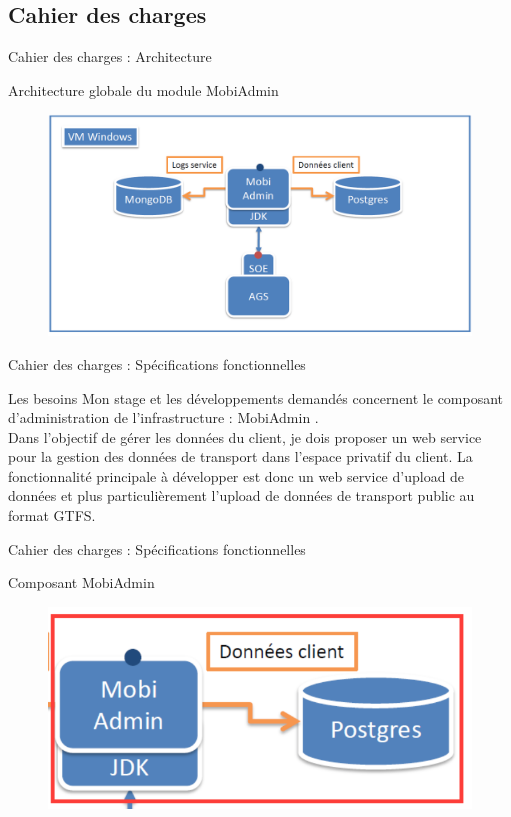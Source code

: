 \documentclass[utf8,compress]{beamer}
\begin{document}
\subsection{Cahier des charges}
\begin{frame}{Cahier des charges : Architecture}
\begin{block}{Architecture globale du module \og MobiAdmin \fg{} }
\begin{figure}[h]
    \center
    \includegraphics[width=\textwidth]{images/architecture.png}
\end{figure}
\end{block}
\end{frame}
\begin{frame}{Cahier des charges : Spécifications fonctionnelles}
\begin{block}{Les besoins}
Mon stage et les développements demandés concernent le composant d'administration de l'infrastructure : \og MobiAdmin \fg. \\

Dans l'objectif de gérer les données du client, je dois proposer un web service pour la gestion des données de transport dans l'espace privatif du client. La fonctionnalité principale à développer est donc un web service d'upload de données et plus particulièrement l'upload de données de transport public au format GTFS.
\end{block}
\end{frame}
\begin{frame}{Cahier des charges : Spécifications fonctionnelles}
\begin{block}{Composant \og MobiAdmin \fg{} }
\begin{figure}[h]
    \center
    \includegraphics[width=\textwidth]{images/archi_module_admin.png}
\end{figure}
\end{block}
\end{frame}
\end{document}
